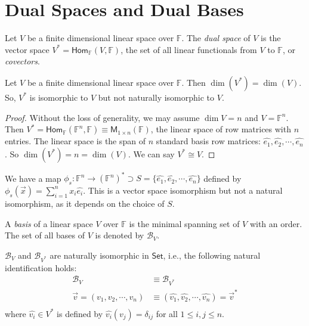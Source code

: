\documentclass[
	11pt, %
	fleqn, %
	a4paper, %
]{LegrandOrangeBook}
\newcommand{\Hom}{\mathsf{Hom}} %
\newcommand{\F}{\mathbb{F}} %
\newcommand{\M}[2]{\mathsf{M}_{#1}(#2)} %
\newcommand{\Set}{\boldsymbol{\mathsf{Set}}} %
\newcommand{\B}{\mathcal{B}} %
\begin{document}
\newpage

\section{Dual Spaces and Dual Bases}

Let $V$ be a finite dimensional linear space over $\F$. The \emph{dual space} of $V$ is the vector space $V^* = \Hom_{\F}(V, \F)$, the set of all linear functionals from $V$ to $\F$, or \emph{covectors}. 

\begin{proposition}
    Let $V$ be a finite dimensional linear space over $\F$. Then $\dim(V^*) = \dim(V)$. So, $V^*$ is isomorphic to $V$ but not naturally isomorphic to $V$.
\end{proposition}
\begin{proof}
    Without the loss of generality, we may assume $\dim{V} = n$ and $V = \F^n$. Then $V^* = \Hom_{\F}(\F^n, \F) \equiv \M{1 \times n}{\F}$, the linear space of row matrices with $n$ entries. The linear space is the span of $n$ standard basis row matrices: $\hat{e_1}, \hat{e_2}, \cdots, \hat{e_n}$. So $\dim(V^*) = n = \dim(V)$. We can say $V^* \cong V$.
\end{proof}

We have a map $\phi_s : \F^n \to (\F^n)^* \supset S = \{\hat{e_1}, \hat{e_2}, \cdots, \hat{e_n}\}$ defined by $\phi_s(\vec{x}) = \sum_{i=1}^n x_i \hat{e_i}$. This is a vector space isomorphism but not a natural isomorphism, as it depends on the choice of $S$.

\begin{definition}[Bases]
    A \emph{basis} of a linear space $V$ over $\F$ is the minimal spanning set of $V$ with an order. The set of all bases of $V$ is denoted by $\B_V$.
\end{definition}

\begin{proposition}
    $\B_V$ and $\B_{V^*}$ are naturally isomorphic in $\Set$, i.e., the following natural identification holds:
    \[
        \begin{split}
            \B_V &\equiv \B_{V^*} \\
            \vec{v} = (v_1, v_2, \cdots, v_n) &\equiv (\hat{v_1}, \hat{v_2}, \cdots, \hat{v_n}) = \vec{v}^* \\
        \end{split}
    \]
    where $\hat{v_i} \in V^*$ is defined by $\hat{v_i}(v_j) = \delta_{ij}$ for all $1 \leq i, j \leq n$.
\end{proposition}
\end{document}
